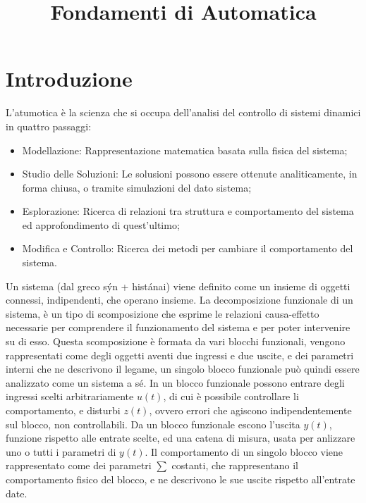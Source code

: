 \documentclass{article}
\title{Fondamenti di Automatica}
\author{}
\date{}
\numberwithin{equation}{subsection}
\begin{document}
\maketitle

\clearpage

\tableofcontents

\clearpage

\section{Introduzione}

L'atumotica è la scienza che si occupa dell'analisi del controllo di sistemi dinamici in quattro passaggi:
\begin{itemize}
    \item Modellazione: Rappresentazione matematica basata sulla fisica del sistema;
    \item Studio delle Soluzioni: Le solusioni possono essere ottenute analiticamente, in forma chiusa, o tramite simulazioni del dato sistema;
    \item Esplorazione: Ricerca di relazioni tra struttura e comportamento del sistema ed approfondimento di quest'ultimo;
    \item Modifica e Controllo: Ricerca dei metodi per cambiare il comportamento del sistema.
\end{itemize}
Un sistema (dal greco s\'{y}n + hist\'{a}nai) viene definito come un insieme di oggetti connessi, indipendenti, che operano insieme.
La decomposizione funzionale di un sistema, è un tipo di scomposizione che esprime le relazioni causa-effetto necessarie per comprendere il 
funzionamento del sistema e per poter intervenire su di esso. 
Questa scomposizione è formata da vari blocchi funzionali, vengono rappresentati come degli oggetti aventi due ingressi e due uscite, e dei parametri 
interni che ne descrivono il legame, un singolo blocco funzionale può quindi essere analizzato come un sistema a sé. In un blocco funzionale possono 
entrare degli ingressi scelti arbitrariamente $u(t)$, di cui è possibile 
controllare li comportamento, e disturbi $z(t)$, ovvero errori che agiscono indipendentemente sul blocco, non controllabili. Da un blocco funzionale 
escono l'uscita $y(t)$, funzione rispetto alle entrate scelte, ed una catena di misura, usata per anlizzare uno o tutti i parametri di $y(t)$. 
Il comportamento di un singolo blocco viene rappresentato come dei parametri $\sum$ costanti, che rappresentano il comportamento fisico del blocco, 
e ne descrivono le sue uscite rispetto all'entrate date. 
\end{document}
